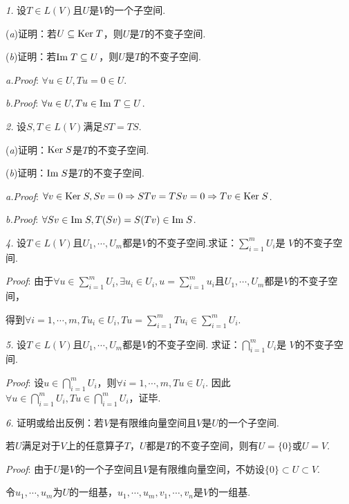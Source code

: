 \textit{1.}
设$T \in L(V)$且$U$是$V$的一个子空间.

(\textit{a})证明：若$U \subseteq \mathrm{Ker \;} T$，则$U$是$T$的不变子空间.

(\textit{b})证明：若$\mathrm{Im \;} T \subseteq U$，则$U$是$T$的不变子空间.

\textit{a.Proof}:
$\forall u \in U,Tu=0 \in U$.

\textit{b.Proof}:
$\forall u \in U,Tu \in \mathrm{Im \;} T \subseteq U$.

\hspace*{\fill}

\textit{2.}
设$S,T \in L(V)$满足$ST=TS$.

(\textit{a})证明：$\mathrm{Ker \;} S$是$T$的不变子空间.

(\textit{b})证明：$\mathrm{Im \;} S$是$T$的不变子空间.

\textit{a.Proof}:
$\forall v \in \mathrm{Ker \;} S,Sv=0 \Rightarrow STv=TSv=0 \Rightarrow Tv \in \mathrm{Ker \;} S$.

\textit{b.Proof}:
$\forall Sv \in \mathrm{Im \;} S,T(Sv)=S(Tv) \in \mathrm{Im \;} S$.

\hspace*{\fill}

\textit{4.}
设$T \in L(V)$且$U_1,\cdots,U_m$都是$V$的不变子空间.求证：$\sum_{i=1}^m U_i$是 $V$的不变子空间.

\textit{Proof}:
由于$\forall u \in \sum_{i=1}^m U_i,\exists u_i \in U_i,u=\sum_{i=1}^m u_i$且$U_1,\cdots,U_m$都是$V$的不变子空间，

得到$\forall i=1,\cdots,m,Tu_i \in U_i,Tu=\sum_{i=1}^m Tu_i \in \sum_{i=1}^m U_i$.

\hspace*{\fill}

\textit{5.}
设$T \in L(V)$且$U_1,\cdots,U_m$都是$V$的不变子空间.
求证：$\bigcap_{i=1}^m U_i$是 $V$的不变子空间.

\textit{Proof}:
设$u \in \bigcap_{i=1}^m U_i$，则$\forall i=1,\cdots,m,Tu \in U_i$.
因此$\forall u \in \bigcap_{i=1}^m U_i,Tu \in \bigcap_{i=1}^m U_i$，证毕.

\hspace*{\fill}

\textit{6.}
证明或给出反例：若$V$是有限维向量空间且$V$是$U$的一个子空间.

若$U$满足对于$V$上的任意算子$T$，$U$都是$T$的不变子空间，则有$U=\{0\}$或$U=V$.

\textit{Proof}:
由于$U$是$V$的一个子空间且$V$是有限维向量空间，不妨设$\{0\} \subset U \subset V$.

令$u_1,\cdots,u_m$为$U$的一组基，$u_1,\cdots,u_m,v_1,\cdots,v_n$是$V$的一组基.

